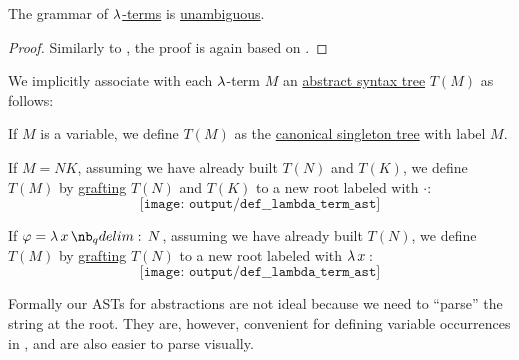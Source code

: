 \begin{proposition}\label{thm:lambda_terms_are_unambiguous}
  The grammar of \hyperref[def:lambda_term]{\( \mathrm{\lambda} \)-terms} is \hyperref[def:grammar_ambiguity]{unambiguous}.
\end{proposition}
\begin{proof}
  Similarly to , the proof is again based on .
\end{proof}

\begin{definition}\label{def:lambda_term_ast}
  We implicitly associate with each \( \mathrm{\lambda} \)-term \( M \) an \hyperref[con:abstract_syntax_tree]{abstract syntax tree} \( T(M) \) as follows:
  \begin{thmenum}
     If \( M \) is a variable, we define \( T(M) \) as the \hyperref[def:canonical_singleton_tree]{canonical singleton tree} with label \( M \).

     If \( M = NK \), assuming we have already built \( T(N) \) and \( T(K) \), we define \( T(M) \) by \hyperref[def:ordered_tree_grafting_product]{grafting} \( T(N) \) and \( T(K) \) to a new root labeled with \( \cdot \):
    \begin{equation*}
      \texttt{[image: output/def\_\_lambda\_term\_ast]}
    \end{equation*}

     If \( \varphi = \qabs x N \), assuming we have already built \( T(N) \), we define \( T(M) \) by \hyperref[def:ordered_tree_grafting_product]{grafting} \( T(N) \) to a new root labeled with \( \qabs* x \):
    \begin{equation*}
      \texttt{[image: output/def\_\_lambda\_term\_ast]}
    \end{equation*}
  \end{thmenum}
\end{definition}
\begin{comments}
  \item Formally our ASTs for abstractions are not ideal because we need to \enquote{parse} the string at the root. They are, however, convenient for defining variable occurrences in , and are also easier to parse visually.
\end{comments}

